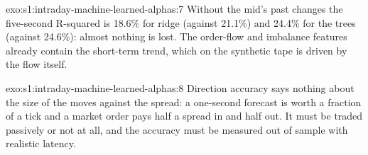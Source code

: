 \begin{solution}{exo:s1:intraday-machine-learned-alphas:7}
Without the mid's past changes the five-second R-squared is 18.6\% for ridge (against 21.1\%) and 24.4\% for the trees (against 24.6\%): almost nothing is lost.
The order-flow and imbalance features already contain the short-term trend, which on the synthetic tape is driven by the flow itself.
\end{solution}

\begin{solution}{exo:s1:intraday-machine-learned-alphas:8}
Direction accuracy says nothing about the size of the moves against the spread: a one-second forecast is worth a fraction of a tick and a market order pays
half a spread in and half out. It must be traded passively or not at all, and the accuracy must be measured out of sample with realistic latency.
\end{solution}

